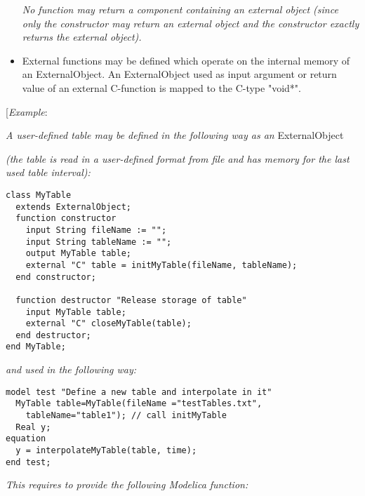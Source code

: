 \begin{itemize}
  \emph{No function may return a component containing an external object
  (since only the constructor may return an external object and the
  constructor exactly returns the external object).}
\item
  External functions may be defined which operate on the internal memory
  of an ExternalObject. An ExternalObject used as input argument or
  return value of an external C-function is mapped to the C-type
  "void*".
\end{itemize}

{[}\emph{Example}:

\emph{A user-defined table may be defined in the following way as an}
ExternalObject

\emph{(the table is read in a user-defined format from file and has
memory for the last used table interval):}

\begin{lstlisting}[language=modelica]
class MyTable
  extends ExternalObject;
  function constructor
    input String fileName := "";
    input String tableName := "";
    output MyTable table;
    external "C" table = initMyTable(fileName, tableName);
  end constructor;

  function destructor "Release storage of table"
    input MyTable table;
    external "C" closeMyTable(table);
  end destructor;
end MyTable;
\end{lstlisting}
\emph{and used in the following way:}

\begin{lstlisting}[language=modelica]
model test "Define a new table and interpolate in it"
  MyTable table=MyTable(fileName ="testTables.txt",
    tableName="table1"); // call initMyTable
  Real y;
equation
  y = interpolateMyTable(table, time);
end test;
\end{lstlisting}
\emph{This requires to provide the following Modelica function:}

